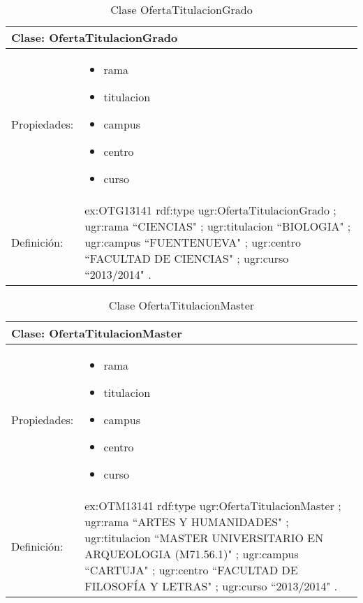 \begin{table}[!ht]
	\centering
	\begin{tabular}{|p{}|p{}|}
		\hline
		\multicolumn{2}{|l|}{Clase: \textbf{OfertaTitulacionGrado}}
		\\ \hline
		Propiedades:&
		\begin{itemize}
			\item rama
			\item titulacion
			\item campus
			\item centro
			\item curso
		\end{itemize}
		\\ \hline
		Definición:&
		ex:OTG13141 rdf:type ugr:OfertaTitulacionGrado ;\newline
		\tab ugr:rama ``CIENCIAS" ;\newline
		\tab ugr:titulacion ``BIOLOGIA" ;\newline
		\tab ugr:campus ``FUENTENUEVA" ;\newline
		\tab ugr:centro ``FACULTAD DE CIENCIAS" ;\newline
		\tab ugr:curso ``2013/2014" .
		\\ \hline
	\end{tabular}
	\caption{Clase OfertaTitulacionGrado}
	\label{clase-ofertatitulaciongrado}
\end{table}

\begin{table}[!ht]
	\centering
	\begin{tabular}{|p{}|p{}|}
		\hline
		\multicolumn{2}{|l|}{Clase: \textbf{OfertaTitulacionMaster}}
		\\ \hline
		Propiedades:&
		\begin{itemize}
			\item rama
			\item titulacion
			\item campus
			\item centro
			\item curso
		\end{itemize}
		\\ \hline
		Definición:&
		ex:OTM13141 rdf:type ugr:OfertaTitulacionMaster ;\newline
		\tab ugr:rama ``ARTES Y HUMANIDADES" ;\newline
		\tab ugr:titulacion ``MASTER UNIVERSITARIO EN ARQUEOLOGIA (M71.56.1)" ;\newline
		\tab ugr:campus ``CARTUJA" ;\newline
		\tab ugr:centro ``FACULTAD DE FILOSOFÍA Y LETRAS" ;\newline
		\tab ugr:curso ``2013/2014" .
		\\ \hline
	\end{tabular}
	\caption{Clase OfertaTitulacionMaster}
	\label{clase-ofertatitulacionmaster}
\end{table}


